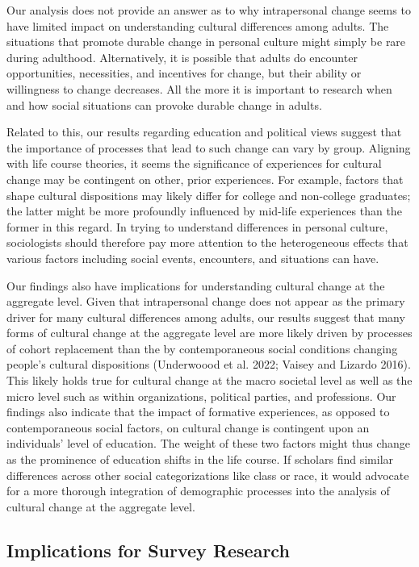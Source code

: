 \documentclass[
  12pt,
]{article}
\begin{document}
Our analysis does not provide an answer as to why intrapersonal change
seems to have limited impact on understanding cultural differences among
adults. The situations that promote durable change in personal culture
might simply be rare during adulthood. Alternatively, it is possible
that adults do encounter opportunities, necessities, and incentives for
change, but their ability or willingness to change decreases. All the
more it is important to research when and how social situations can
provoke durable change in adults.

Related to this, our results regarding education and political views
suggest that the importance of processes that lead to such change can
vary by group. Aligning with life course theories, it seems the
significance of experiences for cultural change may be contingent on
other, prior experiences. For example, factors that shape cultural
dispositions may likely differ for college and non-college graduates;
the latter might be more profoundly influenced by mid-life experiences
than the former in this regard. In trying to understand differences in
personal culture, sociologists should therefore pay more attention to
the heterogeneous effects that various factors including social events,
encounters, and situations can have.

Our findings also have implications for understanding cultural change at
the aggregate level. Given that intrapersonal change does not appear as
the primary driver for many cultural differences among adults, our
results suggest that many forms of cultural change at the aggregate
level are more likely driven by processes of cohort replacement than the
by contemporaneous social conditions changing people's cultural
dispositions (Underwoood et al. 2022; Vaisey and Lizardo 2016). This
likely holds true for cultural change at the macro societal level as
well as the micro level such as within organizations, political parties,
and professions. Our findings also indicate that the impact of formative
experiences, as opposed to contemporaneous social factors, on cultural
change is contingent upon an individuals' level of education. The weight
of these two factors might thus change as the prominence of education
shifts in the life course. If scholars find similar differences across
other social categorizations like class or race, it would advocate for a
more thorough integration of demographic processes into the analysis of
cultural change at the aggregate level.

\hypertarget{implications-for-survey-research}{%
\subsection{Implications for Survey
Research}\label{implications-for-survey-research}}
\end{document}
